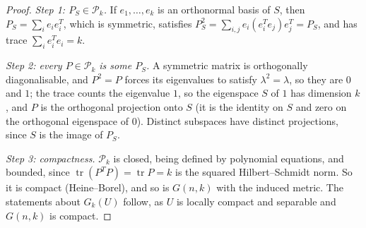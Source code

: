 \begin{proof}
\emph{Step 1: $P_S \in \mathcal{P}_k$.} If $e_1, \ldots, e_k$ is an orthonormal basis of $S$, then $P_S = \sum_ie_ie_i^T$, which is symmetric, satisfies $P_S^2 = \sum_{i, j}e_i(e_i^Te_j)e_j^T = P_S$, and has
trace $\sum_ie_i^Te_i = k$.

\emph{Step 2: every $P \in \mathcal{P}_k$ is some $P_S$.} A symmetric matrix is orthogonally diagonalisable, and $P^2 = P$ forces its eigenvalues to satisfy $\lambda^2 = \lambda$, so they are $0$ and $1$; the
trace counts the eigenvalue $1$, so the eigenspace $S$ of $1$ has dimension $k$, and $P$ is the orthogonal projection onto $S$ (it is the identity on $S$ and zero on the orthogonal eigenspace of $0$).
Distinct subspaces have distinct projections, since $S$ is the image of $P_S$.

\emph{Step 3: compactness.} $\mathcal{P}_k$ is closed, being defined by polynomial equations, and bounded, since $\operatorname{tr}(P^TP) = \operatorname{tr}P = k$ is the squared Hilbert--Schmidt norm.
So it is compact (Heine--Borel), and so is $G(n, k)$ with the induced metric. The statements about $G_k(U)$ follow, as $U$ is locally compact and separable and $G(n, k)$ is compact.
\end{proof}

